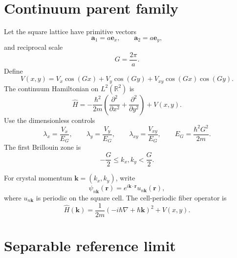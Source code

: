 \section*{Continuum parent family}

Let the square lattice have primitive vectors
\begin{equation}
    \mathbf a_1=a\mathbf e_x,
    \qquad
    \mathbf a_2=a\mathbf e_y,
\end{equation}
and reciprocal scale
\begin{equation}
    G=\frac{2\pi}{a}.
\end{equation}
Define
\begin{equation}
    V(x,y)
    =
    V_x\cos(Gx)
    +
    V_y\cos(Gy)
    +
    V_{xy}\cos(Gx)\cos(Gy).
\end{equation}
The continuum Hamiltonian on $L^2(\mathbb R^2)$ is
\begin{equation}
    \hat H
    =
    -\frac{\hbar^2}{2m}
    \left(
        \frac{\partial^2}{\partial x^2}
        +
        \frac{\partial^2}{\partial y^2}
    \right)
    +
    V(x,y).
\end{equation}
Use the dimensionless controls
\begin{equation}
    \lambda_x=\frac{V_x}{E_G},
    \qquad
    \lambda_y=\frac{V_y}{E_G},
    \qquad
    \lambda_{xy}=\frac{V_{xy}}{E_G},
    \qquad
    E_G=\frac{\hbar^2G^2}{2m}.
\end{equation}
The first Brillouin zone is
\begin{equation}
    -\frac{G}{2}\leq k_x,k_y<\frac{G}{2}.
\end{equation}

For crystal momentum $\mathbf k=(k_x,k_y)$, write
\begin{equation}
    \psi_{n\mathbf k}(\mathbf r)
    =
    e^{i\mathbf k\cdot\mathbf r}
    u_{n\mathbf k}(\mathbf r),
\end{equation}
where $u_{n\mathbf k}$ is periodic on the square cell. The cell-periodic fiber
operator is
\begin{equation}
    \hat H(\mathbf k)
    =
    \frac{1}{2m}
    \left(-i\hbar\nabla+\hbar\mathbf k\right)^2
    +
    V(x,y).
\end{equation}

\section*{Separable reference limit}

